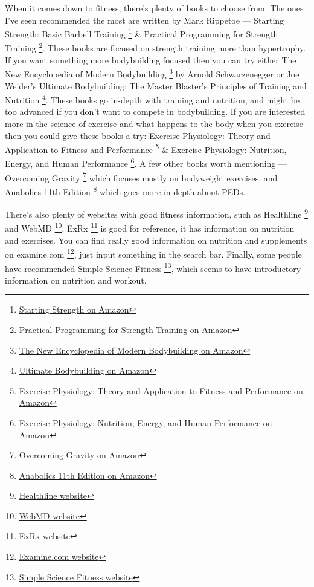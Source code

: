 \documentclass[openany, 12pt]{book}
\begin{document}
        When it comes down to fitness, there's plenty of books to choose from. The ones I've seen recommended the most are written by Mark Rippetoe --- Starting Strength: Basic Barbell Training
        \footnote{\href{https://www.amazon.co.uk/Starting-Strength-Basic-Barbell-Training/dp/0982522738}{Starting Strength on Amazon}} \& Practical Programming for Strength Training
        \footnote{\href{https://www.amazon.co.uk/Practical-Programming-Strength-Training-Rippetoe/dp/0982522754}{Practical Programming for Strength Training on Amazon}}. These books are focused on
        strength training more than hypertrophy. If you want something more bodybuilding focused then you can try either The New Encyclopedia of Modern Bodybuilding
        \footnote{\href{https://www.amazon.co.uk/New-Encyclopedia-Modern-Bodybuilding-Updated/dp/0684857219/}{The New Encyclopedia of Modern Bodybuilding on Amazon}} by Arnold Schwarzenegger or
        Joe Weider's Ultimate Bodybuilding: The Master Blaster's Principles of Training and Nutrition
        \footnote{\href{https://www.amazon.co.uk/Joe-Weiders-Ultimate-Bodybuilding-Weider/dp/0809247151/}{Ultimate Bodybuilding on Amazon}}. These books go in-depth with training and nutrition, and
        might be too advanced if you don't want to compete in bodybuilding.
        If you are interested more in the science of exercise and what happens to the body when you exercise then you could give these
        books a try: Exercise Physiology: Theory and Application to Fitness and Performance
        \footnote{\href{https://www.amazon.co.uk/Exercise-Physiology-Application-Fitness-Performance/dp/0078022533}{Exercise Physiology: Theory and Application to Fitness and Performance on Amazon}}
        \& Exercise Physiology: Nutrition, Energy, and Human Performance
        \footnote{\href{https://www.amazon.co.uk/Exercise-Physiology-Nutrition-Performance-International/dp/1451193831}{Exercise Physiology: Nutrition, Energy, and Human Performance on Amazon}}.
        A few other books worth mentioning --- Overcoming Gravity
        \footnote{\href{https://www.amazon.co.uk/Overcoming-Gravity-Systematic-Gymnastics-Bodyweight/dp/0990873854}{Overcoming Gravity on Amazon}} which focuses mostly on bodyweight exercises, and
        Anabolics 11th Edition
        \footnote{\href{https://www.amazon.co.uk/ANABOLICS-11th-William-Llewellyn/dp/0999062107}{Anabolics 11th Edition on Amazon}} which goes more in-depth about PEDs.

        There's also plenty of websites with good fitness information, such as Healthline
        \footnote{\href{https://www.healthline.com}{Healthline website}} and WebMD
        \footnote{\href{https://www.webmd.com/}{WebMD website}}. ExRx
        \footnote{\href{https://exrx.net/}{ExRx website}} is good for reference, it has information on nutrition and exercises. You can find really good information on nutrition and supplements
        on examine.com
        \footnote{\href{https://examine.com/}{Examine.com website}}, just input something in the search bar. Finally, some people have recommended Simple Science Fitness
        \footnote{\href{https://ss.fitness/}{Simple Science Fitness website}}, which seems to have introductory information on nutrition and workout.
\end{document}
